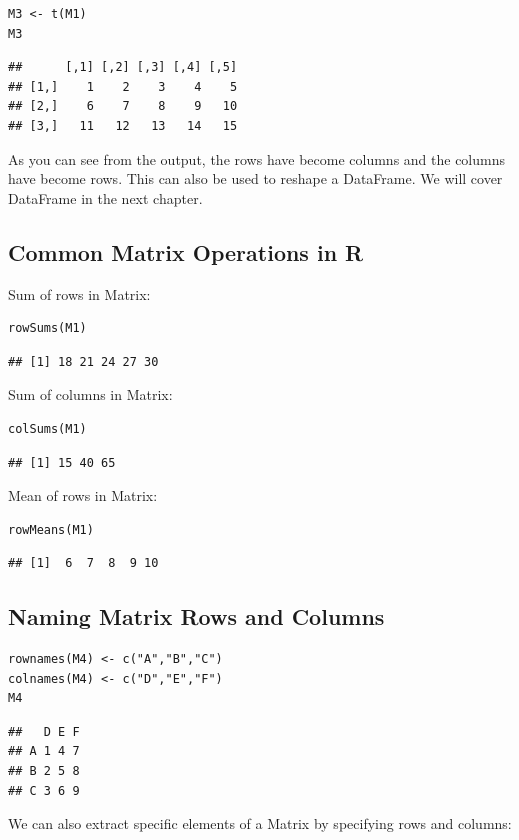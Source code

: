 \documentclass[12pt]{book}
\begin{document}
\begin{verbatim}
M3 <- t(M1)
M3
\end{verbatim}
\begin{verbatim}
##      [,1] [,2] [,3] [,4] [,5]
## [1,]    1    2    3    4    5
## [2,]    6    7    8    9   10
## [3,]   11   12   13   14   15
\end{verbatim}
As you can see from the output, the rows have become columns and the columns have become rows. This can also be used to reshape a DataFrame. We will cover DataFrame in the next chapter.

\subsection{Common Matrix Operations in R}
Sum of rows in Matrix:
\begin{verbatim}
rowSums(M1)
\end{verbatim}
\begin{verbatim}
## [1] 18 21 24 27 30
\end{verbatim}

Sum of columns in Matrix:
\begin{verbatim}
colSums(M1)
\end{verbatim}
\begin{verbatim}
## [1] 15 40 65
\end{verbatim}

Mean of rows in Matrix:
\begin{verbatim}
rowMeans(M1)
\end{verbatim}
\begin{verbatim}
## [1]  6  7  8  9 10
\end{verbatim}

\subsection{Naming Matrix Rows and Columns}
\begin{verbatim}
rownames(M4) <- c("A","B","C")
colnames(M4) <- c("D","E","F")
M4
\end{verbatim}
\begin{verbatim}
##   D E F
## A 1 4 7
## B 2 5 8
## C 3 6 9
\end{verbatim}

We can also extract specific elements of a Matrix by specifying rows and columns:
\end{document}
